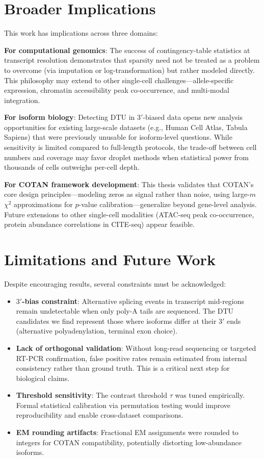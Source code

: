 \section{Broader Implications}

This work has implications across three domains:

\textbf{For computational genomics}: The success of contingency-table statistics at transcript resolution demonstrates that sparsity need not be treated as a problem to overcome (via imputation or log-transformation) but rather modeled directly. This philosophy may extend to other single-cell challenges---allele-specific expression, chromatin accessibility peak co-occurrence, and multi-modal integration.

\textbf{For isoform biology}: Detecting DTU in $3'$-biased data opens new analysis opportunities for existing large-scale datasets (e.g., Human Cell Atlas, Tabula Sapiens) that were previously unusable for isoform-level questions. While sensitivity is limited compared to full-length protocols, the trade-off between cell numbers and coverage may favor droplet methods when statistical power from thousands of cells outweighs per-cell depth.

\textbf{For COTAN framework development}: This thesis validates that COTAN's core design principles---modeling zeros as signal rather than noise, using large-$m$ $\chi^2$ approximations for $p$-value calibration---generalize beyond gene-level analysis. Future extensions to other single-cell modalities (ATAC-seq peak co-occurrence, protein abundance correlations in CITE-seq) appear feasible.

\section{Limitations and Future Work}

Despite encouraging results, several constraints must be acknowledged:
\begin{itemize}
    \item \textbf{$3'$-bias constraint}: Alternative splicing events in transcript mid-regions remain undetectable when only poly-A tails are sequenced. The DTU candidates we find represent those where isoforms differ at their $3'$ ends (alternative polyadenylation, terminal exon choice).

    \item \textbf{Lack of orthogonal validation}: Without long-read sequencing or targeted RT-PCR confirmation, false positive rates remain estimated from internal consistency rather than ground truth. This is a critical next step for biological claims.

    \item \textbf{Threshold sensitivity}: The contrast threshold $\tau$ was tuned empirically. Formal statistical calibration via permutation testing would improve reproducibility and enable cross-dataset comparisons.

    \item \textbf{EM rounding artifacts}: Fractional EM assignments were rounded to integers for COTAN compatibility, potentially distorting low-abundance isoforms.
\end{itemize}

